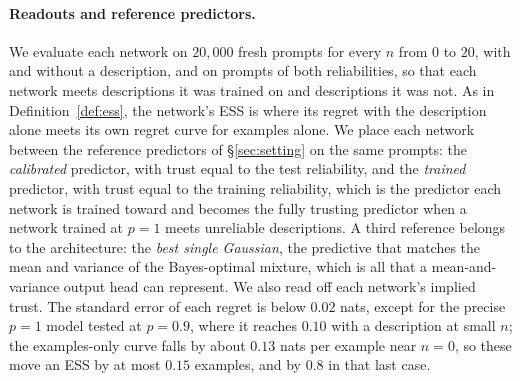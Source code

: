 \documentclass[10pt]{article}
\begin{document}
\paragraph{Readouts and reference predictors.}
We evaluate each network on $20{,}000$ fresh prompts for every $n$ from $0$ to $20$, with and without a description, and on prompts of both reliabilities, so that each network meets descriptions it was trained on and descriptions it was not. As in Definition~\ref{def:ess}, the network's ESS is where its regret with the description alone meets its own regret curve for examples alone. We place each network between the reference predictors of \S\ref{sec:setting} on the same prompts: the \emph{calibrated} predictor, with trust equal to the test reliability, and the \emph{trained} predictor, with trust equal to the training reliability, which is the predictor each network is trained toward and becomes the fully trusting predictor when a network trained at $p = 1$ meets unreliable descriptions. A third reference belongs to the architecture: the \emph{best single Gaussian}, the predictive that matches the mean and variance of the Bayes-optimal mixture, which is all that a mean-and-variance output head can represent. We also read off each network's implied trust. The standard error of each regret is below $0.02$ nats, except for the precise $p = 1$ model tested at $p = 0.9$, where it reaches $0.10$ with a description at small $n$; the examples-only curve falls by about $0.13$ nats per example near $n = 0$, so these move an ESS by at most $0.15$ examples, and by $0.8$ in that last case.

\begin{table}[t]
\centering\small
\caption{Networks against the reference predictors ($d=5$, $a_0=10$, one training run per model, 20{,}000 evaluation prompts). The first four rows test each network on its training distribution, the last four on the other reliability. ``Trained'' is the Bayes-optimal predictor with trust equal to $p_{\mathrm{train}}$, ``calibrated'' the one with trust equal to $p_{\mathrm{test}}$ (shown where the two differ), and ``single Gaussian'' the best predictive a mean-and-variance head can express, shown where the Bayes-optimal predictive is a two-component mixture. The last two columns are the mean regret gap, network minus the trained predictor, over $n = 0, \dots, 20$, with and without a description.}
\label{tab:networks}

\end{table}
\end{document}
